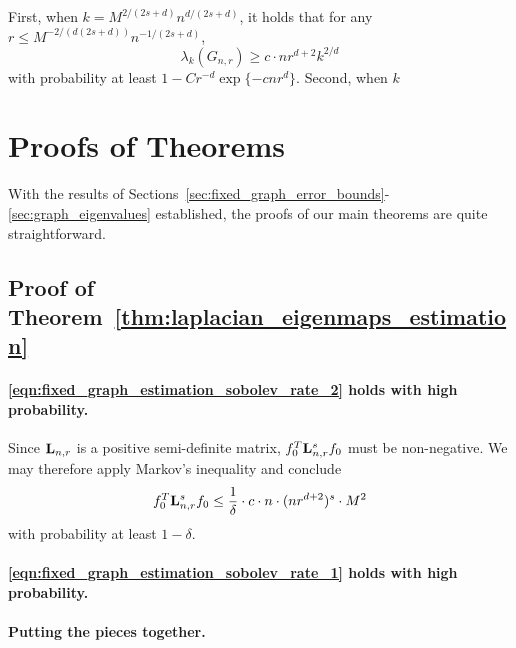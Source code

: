 \documentclass{article}
\newcommand{\1}{\mathbf{1}}
\newcommand{\Lap}{{\bf L}}
\theoremstyle{alden}
\theoremstyle{aldenthm}
\theoremstyle{definition}
\theoremstyle{remark}
\begin{document}
First, when $k = M^{2/(2s + d)} n^{d/(2s + d)}$, it holds that for any $r \leq M^{-2/(d(2s +d))} n^{-1/(2s + d)}$, 
\begin{equation}
\label{eqn:neighborhood_eigenvalue_1}
\lambda_{k}(G_{n,r}) \geq c \cdot nr^{d+2}{k}^{2/d}
\end{equation}
with probability at least $1 - C r^{-d} \exp\{- c n r^d\}$. Second, when $k$


\section{Proofs of Theorems}
\label{sec:proofs_theorems}
With the results of Sections~\ref{sec:fixed_graph_error_bounds}-\ref{sec:graph_eigenvalues} established, the proofs of our main theorems are quite straightforward.

\subsection{Proof of Theorem~\ref{thm:laplacian_eigenmaps_estimation}}
\label{subsec:laplacian_eigenmaps_estimation_pf}


\paragraph{\eqref{eqn:fixed_graph_estimation_sobolev_rate_2} holds with high probability.}

Since $\Lap_{n,r}$ is a positive semi-definite matrix, $f_0^T \Lap_{{n,r}}^s f_0$ must be non-negative. We may therefore apply Markov's inequality and conclude
\begin{equation}
\label{eqn:roughness_functional_probability_sobolev}
f_0^T \Lap_{{n,r}}^s f_0 \leq  \frac{1}{\delta} \cdot c \cdot n \cdot (nr^{d+2})^s \cdot M^2
\end{equation}
with probability at least $1 - \delta$.

\paragraph{\eqref{eqn:fixed_graph_estimation_sobolev_rate_1} holds with high probability.}

\paragraph{Putting the pieces together.}
\end{document}
